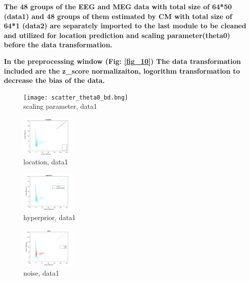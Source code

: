 \documentclass[5p]{elsarticle}
\begin{document}
\begin{frontmatter}
\bf The 48 groups of the EEG and MEG data with total size of 64*50 (data1) and 48 groups of them estimated by CM with total size of 64*1 (data2) are separately imported to the last module to be cleaned and utilized for location prediction and scaling parameter(theta0) before the data transformation. 

\bf In the preprocessing window (Fig: \ref{fig_10}) The data transformation included are the z_score normalizaiton, logorithm transformation to decrease the bias of the data.

\begin{figure}[h!]
\begin{footnotesize}
\begin{center}

\begin{minipage}{3cm} \begin{center}
\texttt{[image: scatter\_theta0\_bd.bng]} \\ scaling parameter, data1 
\end{center}\end{minipage}
\begin{minipage}{3cm} \begin{center}
\includegraphics[height=2.0cm]{scatter_loc_bd.png}\\ location, data1  
\end{center}\end{minipage}
\begin{minipage}{3cm} \begin{center}
\includegraphics[height=2.0cm]{scatter_hyperprior_bd.png} \\ hyperprior, data1
\end{center}\end{minipage}
\begin{minipage}{3cm} \begin{center}
\includegraphics[height=2.0cm]{scatter_noise_bd.png} \\ noise, data1

\end{center}
\end{minipage}
\end{center}
\end{footnotesize}
\end{figure}
\end{frontmatter}
\end{document}
